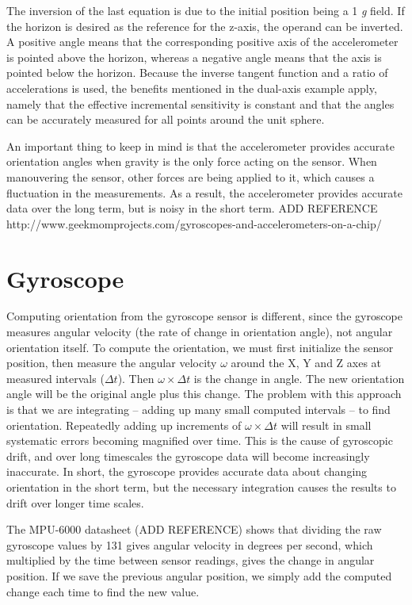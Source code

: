 The inversion of the last equation is due to the initial position being a 1 \textit{g} field. If the horizon is desired as the reference for the z-axis, the operand can be inverted. A positive angle means that the corresponding positive axis of the accelerometer is pointed above the horizon, whereas a negative angle means that the axis is pointed below the horizon. Because the inverse tangent function and a ratio of accelerations is used, the benefits mentioned in the dual-axis example apply, namely that the effective incremental sensitivity is constant and that the angles can be accurately measured for all points around the unit sphere.

An important thing to keep in mind is that the accelerometer provides accurate orientation angles when gravity is the only force acting on the sensor. When manouvering the sensor, other forces are being applied to it, which causes a fluctuation in the measurements. As a result, the accelerometer provides accurate data over the long term, but is noisy in the short term. ADD REFERENCE http://www.geekmomprojects.com/gyroscopes-and-accelerometers-on-a-chip/

\section{Gyroscope}
Computing orientation from the gyroscope sensor is different, since the gyroscope measures angular velocity (the rate of change in orientation angle), not angular orientation itself. To compute the orientation, we must first initialize the sensor position, then measure the angular velocity $\omega$ around the X, Y and Z axes at measured intervals ($\Delta t$).   Then $\omega \times \Delta t$ is the change in angle. The new orientation angle will be the original angle plus this change. The problem with this approach is that we are integrating – adding up many small computed intervals – to find orientation.  Repeatedly adding up increments of  $\omega \times \Delta t$ will result in small systematic errors becoming magnified over time. This is the cause of gyroscopic drift, and over long timescales the gyroscope data will become increasingly inaccurate. In short, the gyroscope provides accurate data about changing orientation in the short term, but the necessary integration causes the results to drift over longer time scales.

The MPU-6000 datasheet (ADD REFERENCE) shows that dividing the raw gyroscope values by 131 gives angular velocity in degrees per second, which multiplied by the time between sensor readings, gives the change in angular position. If we save the previous angular position, we simply add the computed change each time to find the new value.


